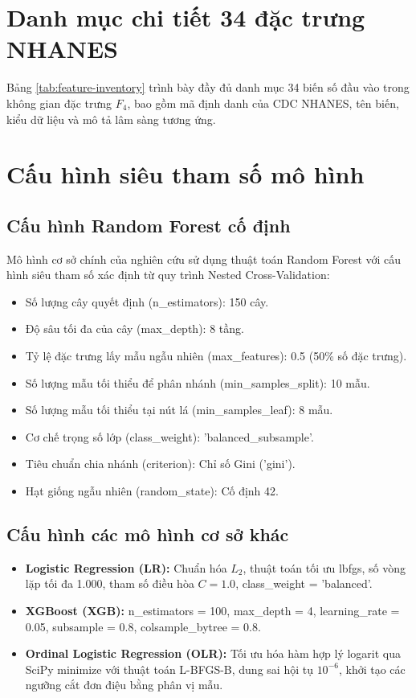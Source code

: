 \chapter{Danh mục chi tiết 34 đặc trưng NHANES}
\label{app:feature-inventory}

Bảng \ref{tab:feature-inventory} trình bày đầy đủ danh mục 34 biến số đầu vào trong không gian đặc trưng $F_4$, bao gồm mã định danh của CDC NHANES, tên biến, kiểu dữ liệu và mô tả lâm sàng tương ứng.



\chapter{Cấu hình siêu tham số mô hình}
\label{app:hyperparameters}

\section{Cấu hình Random Forest cố định}
Mô hình cơ sở chính của nghiên cứu sử dụng thuật toán Random Forest với cấu hình siêu tham số xác định từ quy trình Nested Cross-Validation:
\begin{itemize}
    \item Số lượng cây quyết định (\textnormal{n\_estimators}): 150 cây.
    \item Độ sâu tối đa của cây (\textnormal{max\_depth}): 8 tầng.
    \item Tỷ lệ đặc trưng lấy mẫu ngẫu nhiên (\textnormal{max\_features}): 0.5 (50\% số đặc trưng).
    \item Số lượng mẫu tối thiểu để phân nhánh (\textnormal{min\_samples\_split}): 10 mẫu.
    \item Số lượng mẫu tối thiểu tại nút lá (\textnormal{min\_samples\_leaf}): 8 mẫu.
    \item Cơ chế trọng số lớp (\textnormal{class\_weight}): \textnormal{'balanced\_subsample'}.
    \item Tiêu chuẩn chia nhánh (\textnormal{criterion}): Chỉ số Gini (\textnormal{'gini'}).
    \item Hạt giống ngẫu nhiên (\textnormal{random\_state}): Cố định 42.
\end{itemize}

\section{Cấu hình các mô hình cơ sở khác}
\begin{itemize}
    \item \textbf{Logistic Regression (LR):} Chuẩn hóa $L_2$, thuật toán tối ưu lbfgs, số vòng lặp tối đa 1.000, tham số điều hòa $C = 1.0$, \textnormal{class\_weight = 'balanced'}.
    \item \textbf{XGBoost (XGB):} \textnormal{n\_estimators = 100, max\_depth = 4, learning\_rate = 0.05, subsample = 0.8, colsample\_bytree = 0.8}.
    \item \textbf{Ordinal Logistic Regression (OLR):} Tối ưu hóa hàm hợp lý logarit qua SciPy minimize với thuật toán L-BFGS-B, dung sai hội tụ $10^{-6}$, khởi tạo các ngưỡng cắt đơn điệu bằng phân vị mẫu.
\end{itemize}

